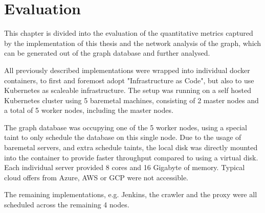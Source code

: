 \chapter{Evaluation}

This chapter is divided into the evaluation of the quantitative metrics captured by the implementation of this thesis and the network analysis of the graph, which can be generated out of the graph database and further analysed.

All previously described implementations were wrapped into individual docker containers, to first and foremost adopt "Infrastructure as Code", but also to use Kubernetes as scaleable infrastructure. The setup was running on a self hosted Kubernetes cluster using 5 baremetal machines, consisting of 2 master nodes and a total of 5 worker nodes, including the master nodes.

The graph database was occupying one of the 5 worker nodes, using a special taint to only schedule the database on this single node. Due to the usage of baremetal servers, and extra schedule taints, the local disk was directly mounted into the container to provide faster throughput compared to using a virtual disk. Each individual server provided 8 cores and 16 Gigabyte of memory. Typical cloud offers from Azure, AWS or GCP were not accessible.

The remaining implementations, e.g. Jenkins, the crawler and the proxy were all scheduled across the remaining 4 nodes.


